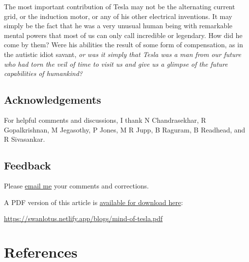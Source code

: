 \documentclass[
  a4paper,
]{article}
\begin{document}
The most important contribution of Tesla may not be the alternating
current grid, or the induction motor, or any of his other electrical
inventions. It may simply be the fact that he was a very unusual human
being with remarkable mental powers that most of us can only call
incredible or legendary. How did he come by them? Were his abilities the
result of some form of compensation, as in the autistic idiot savant,
\emph{or was it simply that Tesla was a man from our future who had torn
the veil of time to visit us and give us a glimpse of the future
capabilities of humankind?}

\hypertarget{acknowledgements}{%
\subsection{Acknowledgements}\label{acknowledgements}}

For helpful comments and discussions, I thank N Chandrasekhar, R
Gopalkrishnan, M Jegasothy, P Jones, M R Jupp, B Raguram, B Readhead,
and R Sivasankar.

\hypertarget{feedback}{%
\subsection{Feedback}\label{feedback}}

Please \href{mailto:feedback.swanlotus@gmail.com}{email me} your
comments and corrections.

\noindent A PDF version of this article is
\href{./mind-of-tesla.pdf}{available for download here}:

\begin{normalsize}

\begin{ttfamily}

\url{https://swanlotus.netlify.app/blogs/mind-of-tesla.pdf}

\end{ttfamily}

\end{normalsize}

\hypertarget{bibliography}{%
\section*{References}\label{bibliography}}
\end{document}
